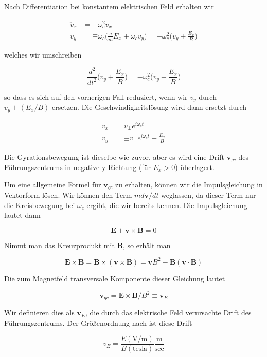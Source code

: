 \documentclass[
  a4paper,
  DIV=11]{scrreprt}
\begin{document}
Nach Differentiation bei konstantem elektrischen Feld erhalten wir

\[
\begin{aligned}
\ddot{v}_x &= -\omega_c^2 v_x \\
\ddot{v}_y &= \mp \omega_c \Big( \frac{q}{m}E_x \pm \omega_c v_y \Big) = -\omega_c^2 \Big( v_y + \frac{E_x}{B} \Big)
\end{aligned}
\]

welches wir umschreiben

\[
\frac{d^2}{dt^2}\Big( v_y + \frac{E_x}{B} \Big) = -\omega_c^2\Big( v_y + \frac{E_x}{B} \Big)
\]

so dass es sich auf den vorherigen Fall reduziert, wenn wir \(v_y\)
durch \(v_y + (E_x/B)\) ersetzen. Die Geschwindigkeitslösung wird dann
ersetzt durch

\[
\begin{aligned}
v_x &= v_\perp e^{i\omega_c t} \\
v_y &= \pm v_\perp e^{i\omega_c t} - \frac{E_x}{B}
\end{aligned}
\]

Die Gyrationsbewegung ist dieselbe wie zuvor, aber es wird eine Drift
\(\mathbf{v}_{gc}\) des Führungszentrums in negative y-Richtung (für
\(E_x > 0\)) überlagert.

Um eine allgemeine Formel für \(\mathbf{v}_{gc}\) zu erhalten, können
wir die Impulsgleichung in Vektorform lösen. Wir können den Term
\(m d\mathbf{v}/dt\) weglassen, da dieser Term nur die Kreisbewegung bei
\(\omega_c\) ergibt, die wir bereits kennen. Die Impulsgleichung lautet
dann

\[
\mathbf{E} + \mathbf{v}\times\mathbf{B} = 0
\]

Nimmt man das Kreuzprodukt mit \(\mathbf{B}\), so erhält man

\[
\mathbf{E}\times\mathbf{B} = \mathbf{B}\times(\mathbf{v}\times\mathbf{B}) = \mathbf{v}B^2 - \mathbf{B}(\mathbf{v}\cdot\mathbf{B})
\]

Die zum Magnetfeld transversale Komponente dieser Gleichung lautet

\[
\mathbf{v}_{gc} = \mathbf{E}\times\mathbf{B}/B^2 \equiv \mathbf{v}_E
\]

Wir definieren dies als \(\mathbf{v}_E\), die durch das elektrische Feld
verursachte Drift des Führungszentrums. Der Größenordnung nach ist diese
Drift

\[
v_E = \frac{E(\text{V/m})}{B(\text{tesla})}\frac{\text{m}}{\text{sec}}
\]
\end{document}
